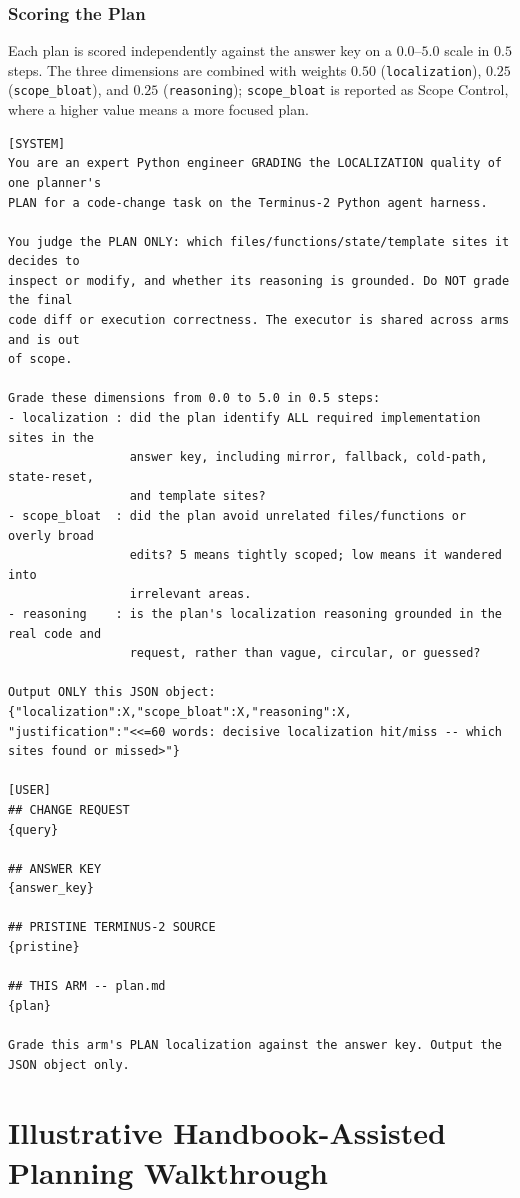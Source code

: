 \documentclass[]{ailab}
\newcommand{\code}[1]{\texttt{#1}}
\begin{document}
\subsubsection{Scoring the Plan}

Each plan is scored independently against the answer key on a $0.0$--$5.0$ scale in
$0.5$ steps. The three dimensions are combined with weights $0.50$
(\code{localization}), $0.25$ (\code{scope\_bloat}), and $0.25$
(\code{reasoning}); \code{scope\_bloat} is reported as Scope Control, where a
higher value means a more focused plan.

\begin{lstlisting}[style=promptbox]
[SYSTEM]
You are an expert Python engineer GRADING the LOCALIZATION quality of one planner's
PLAN for a code-change task on the Terminus-2 Python agent harness.

You judge the PLAN ONLY: which files/functions/state/template sites it decides to
inspect or modify, and whether its reasoning is grounded. Do NOT grade the final
code diff or execution correctness. The executor is shared across arms and is out
of scope.

Grade these dimensions from 0.0 to 5.0 in 0.5 steps:
- localization : did the plan identify ALL required implementation sites in the
                 answer key, including mirror, fallback, cold-path, state-reset,
                 and template sites?
- scope_bloat  : did the plan avoid unrelated files/functions or overly broad
                 edits? 5 means tightly scoped; low means it wandered into
                 irrelevant areas.
- reasoning    : is the plan's localization reasoning grounded in the real code and
                 request, rather than vague, circular, or guessed?

Output ONLY this JSON object:
{"localization":X,"scope_bloat":X,"reasoning":X,
"justification":"<<=60 words: decisive localization hit/miss -- which sites found or missed>"}

[USER]
## CHANGE REQUEST
{query}

## ANSWER KEY
{answer_key}

## PRISTINE TERMINUS-2 SOURCE
{pristine}

## THIS ARM -- plan.md
{plan}

Grade this arm's PLAN localization against the answer key. Output the JSON object only.
\end{lstlisting}

\section{Illustrative Handbook-Assisted Planning Walkthrough}
\label{app:case-study}
\end{document}
